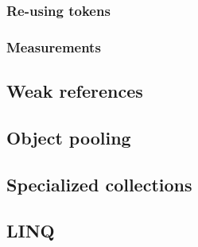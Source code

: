 \subsubsection{Re-using tokens}
\label{sec:re-use-tokens}

\subsubsection{Measurements}
\label{sec:re-use-measurements}

\subsection{Weak references}
\label{sec:weak-references}

\subsection{Object pooling}
\label{sec:object-pooling}

\subsection{Specialized collections}
\label{sec:specialized-collections}

\subsection{LINQ}
\label{sec:linq}
















